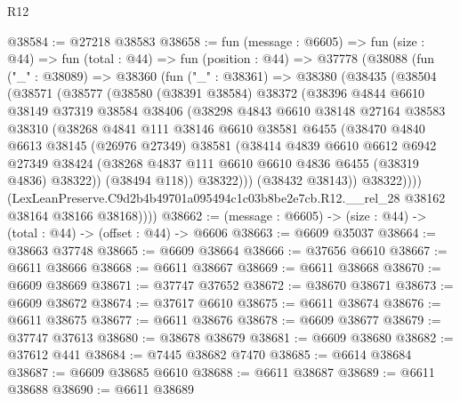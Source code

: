 \begin{lexlean}{R12}
\begin{coremodule}
@38584 := @27218 @38583
@38658 := fun (message : @6605) =>
  fun (size : @44) =>
  fun (total : @44) =>
  fun (position : @44) =>
  @37778
    (@38088
      (fun ("_" : @38089) =>
      @38360
        (fun ("_" : @38361) =>
        @38380
          (@38435
            (@38504
              (@38571
                (@38577
                  (@38580
                    (@38391 @38584)
                    @38372
                    (@38396
                      @4844
                      @6610
                      @38149
                      @37319
                      @38584
                      @38406
                      (@38298
                        @4843
                        @6610
                        @38148
                        @27164
                        @38583
                        @38310
                        (@38268
                          @4841
                          @111
                          @38146
                          @6610
                          @38581
                          @6455
                          (@38470
                            @4840
                            @6613
                            @38145
                            (@26976 @27349)
                            @38581
                            (@38414
                              @4839
                              @6610
                              @6612
                              @6942
                              @27349
                              @38424
                              (@38268 @4837 @111 @6610 @6610 @4836 @6455 (@38319 @4836) @38322))
                            (@38494 @118))
                          @38322)))
                    (@38432 @38143))
                  @38322))))
          (LexLeanPreserve.C9d2b4b49701a095494c1c03b8be2e7cb.R12.__rel_28
            @38162
            @38164
            @38166
            @38168))))
@38662 := (message : @6605) -> (size : @44) -> (total : @44) -> (offset : @44) -> @6606
@38663 := @6609 @35037
@38664 := @38663 @37748
@38665 := @6609 @38664
@38666 := @37656 @6610
@38667 := @6611 @38666
@38668 := @6611 @38667
@38669 := @6611 @38668
@38670 := @6609 @38669
@38671 := @37747 @37652
@38672 := @38670 @38671
@38673 := @6609 @38672
@38674 := @37617 @6610
@38675 := @6611 @38674
@38676 := @6611 @38675
@38677 := @6611 @38676
@38678 := @6609 @38677
@38679 := @37747 @37613
@38680 := @38678 @38679
@38681 := @6609 @38680
@38682 := @37612 @441
@38684 := @7445 @38682 @7470
@38685 := @6614 @38684
@38687 := @6609 @38685 @6610
@38688 := @6611 @38687
@38689 := @6611 @38688
@38690 := @6611 @38689

\end{coremodule}
\end{lexlean}
